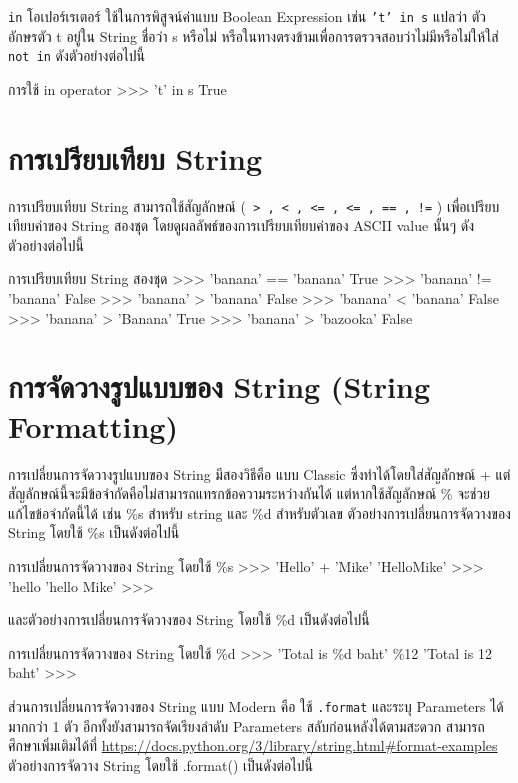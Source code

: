 \texttt{in} โอเปอร์เรเตอร์ ใช้ในการพิสูจน์ค่าแบบ Boolean Expression เช่น \texttt{'t' in s} แปลว่า ตัวอักษรตัว t อยู่ใน String ชื่อว่า s หรือไม่ หรือในทางตรงข้ามเพื่อการตรวจสอบว่าไม่มีหรือไม่ให้ใส่ \texttt{not in} ดังตัวอย่างต่อไปนี้ 

\begin{codelist}{การใช้ in operator}{}
>>> 't' in s
True
\end{codelist}

\section{การเปรียบเทียบ String}

การเปรียบเทียบ String สามารถใช้สัญลักษณ์  (\texttt{ > , < , <= , <= , == , !=}  ) เพื่อเปรียบเทียบค่าของ String สองชุด โดยดูผลลัพธ์ของการเปรียบเทียบค่าของ ASCII value นั้นๆ ดังตัวอย่างต่อไปนี้

\begin{codelist}{การเปรียบเทียบ String สองชุด}{}
>>> 'banana' == 'banana'
True
>>> 'banana' !=  'banana'
False
>>>  'banana' >  'banana'
False
>>>  'banana' <  'banana'
False
>>>  'banana' >  'Banana'
True
>>>  'banana' >  'bazooka'
False
\end{codelist}


\section{การจัดวางรูปแบบของ String (String Formatting)}

การเปลี่ยนการจัดวางรูปแบบของ String มีสองวิธีคือ แบบ Classic ซึ่งทำได้โดยใส่สัญลักษณ์ + แต่สัญลักษณ์นี้จะมีข้อจำกัดคือไม่สามารถแทรกข้อความระหว่างกันได้ แต่หากใช้สัญลักษณ์ \% จะช่วยแก้ไขข้อจำกัดนี้ได้ เช่น \%s สำหรับ string และ \%d สำหรับตัวเลข ตัวอย่างการเปลี่ยนการจัดวางของ String โดยใช้ \%s เป็นดังต่อไปนี้

\begin{codelist}{การเปลี่ยนการจัดวางของ String โดยใช้ \%s}{}
>>> 'Hello' + 'Mike'
'HelloMike'
>>> 'hello %
'hello Mike'
>>>
\end{codelist}

และตัวอย่างการเปลี่ยนการจัดวางของ String โดยใช้ \%d เป็นดังต่อไปนี้

\begin{codelist}{การเปลี่ยนการจัดวางของ String โดยใช้ \%d}{}
>>> 'Total is \%d baht' \%12
'Total is 12 baht'
>>>
\end{codelist}

ส่วนการเปลี่ยนการจัดวางของ String แบบ Modern คือ ใช้ \texttt{.format} และระบุ Parameters ได้มากกว่า 1 ตัว อีกทั้งยังสามารถจัดเรียงลำดับ Parameters สลับก่อนหลังได้ตามสะดวก สามารถศึกษาเพิ่มเติมได้ที่ \url{https://docs.python.org/3/library/string.html\#format-examples} ตัวอย่างการจัดวาง String โดยใช้ .format() เป็นดังต่อไปนี้


